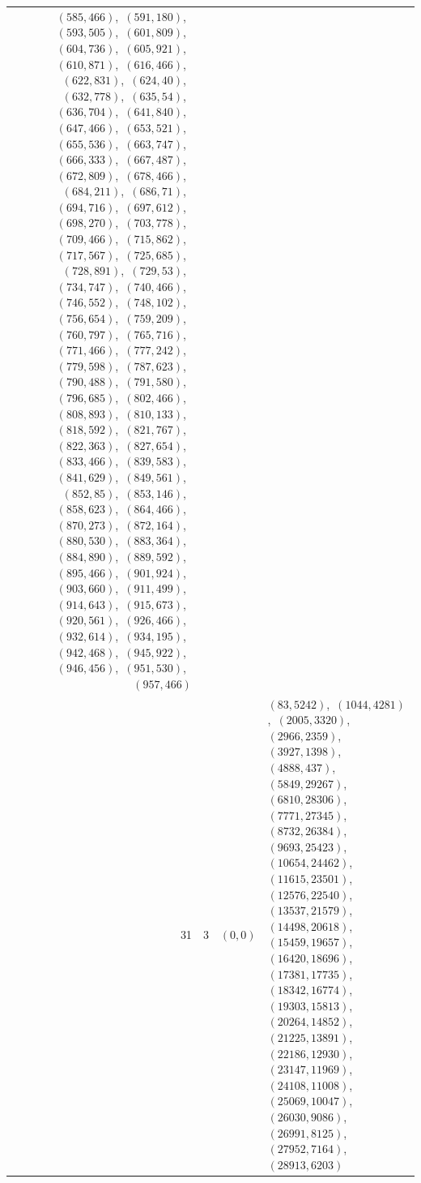 \documentclass[11pt]{article}
\begin{document}
\begin{longtable}{@{}rrl>{\raggedright\arraybackslash}p{}@{}}
$(585,466)$,\allowbreak\ $(591,180)$,\allowbreak\ $(593,505)$,\allowbreak\ $(601,809)$,\allowbreak\ $(604,736)$,\allowbreak\ $(605,921)$,\allowbreak\ $(610,871)$,\allowbreak\ $(616,466)$,\allowbreak\ $(622,831)$,\allowbreak\ $(624,40)$,\allowbreak\ $(632,778)$,\allowbreak\ $(635,54)$,\allowbreak\ $(636,704)$,\allowbreak\ $(641,840)$,\allowbreak\ $(647,466)$,\allowbreak\ $(653,521)$,\allowbreak\ $(655,536)$,\allowbreak\ $(663,747)$,\allowbreak\ $(666,333)$,\allowbreak\ $(667,487)$,\allowbreak\ $(672,809)$,\allowbreak\ $(678,466)$,\allowbreak\ $(684,211)$,\allowbreak\ $(686,71)$,\allowbreak\ $(694,716)$,\allowbreak\ $(697,612)$,\allowbreak\ $(698,270)$,\allowbreak\ $(703,778)$,\allowbreak\ $(709,466)$,\allowbreak\ $(715,862)$,\allowbreak\ $(717,567)$,\allowbreak\ $(725,685)$,\allowbreak\ $(728,891)$,\allowbreak\ $(729,53)$,\allowbreak\ $(734,747)$,\allowbreak\ $(740,466)$,\allowbreak\ $(746,552)$,\allowbreak\ $(748,102)$,\allowbreak\ $(756,654)$,\allowbreak\ $(759,209)$,\allowbreak\ $(760,797)$,\allowbreak\ $(765,716)$,\allowbreak\ $(771,466)$,\allowbreak\ $(777,242)$,\allowbreak\ $(779,598)$,\allowbreak\ $(787,623)$,\allowbreak\ $(790,488)$,\allowbreak\ $(791,580)$,\allowbreak\ $(796,685)$,\allowbreak\ $(802,466)$,\allowbreak\ $(808,893)$,\allowbreak\ $(810,133)$,\allowbreak\ $(818,592)$,\allowbreak\ $(821,767)$,\allowbreak\ $(822,363)$,\allowbreak\ $(827,654)$,\allowbreak\ $(833,466)$,\allowbreak\ $(839,583)$,\allowbreak\ $(841,629)$,\allowbreak\ $(849,561)$,\allowbreak\ $(852,85)$,\allowbreak\ $(853,146)$,\allowbreak\ $(858,623)$,\allowbreak\ $(864,466)$,\allowbreak\ $(870,273)$,\allowbreak\ $(872,164)$,\allowbreak\ $(880,530)$,\allowbreak\ $(883,364)$,\allowbreak\ $(884,890)$,\allowbreak\ $(889,592)$,\allowbreak\ $(895,466)$,\allowbreak\ $(901,924)$,\allowbreak\ $(903,660)$,\allowbreak\ $(911,499)$,\allowbreak\ $(914,643)$,\allowbreak\ $(915,673)$,\allowbreak\ $(920,561)$,\allowbreak\ $(926,466)$,\allowbreak\ $(932,614)$,\allowbreak\ $(934,195)$,\allowbreak\ $(942,468)$,\allowbreak\ $(945,922)$,\allowbreak\ $(946,456)$,\allowbreak\ $(951,530)$,\allowbreak\ $(957,466)$\\
31 & 3 & $(0,0)$ & $(83,5242)$,\allowbreak\ $(1044,4281)$,\allowbreak\ $(2005,3320)$,\allowbreak\ $(2966,2359)$,\allowbreak\ $(3927,1398)$,\allowbreak\ $(4888,437)$,\allowbreak\ $(5849,29267)$,\allowbreak\ $(6810,28306)$,\allowbreak\ $(7771,27345)$,\allowbreak\ $(8732,26384)$,\allowbreak\ $(9693,25423)$,\allowbreak\ $(10654,24462)$,\allowbreak\ $(11615,23501)$,\allowbreak\ $(12576,22540)$,\allowbreak\ $(13537,21579)$,\allowbreak\ $(14498,20618)$,\allowbreak\ $(15459,19657)$,\allowbreak\ $(16420,18696)$,\allowbreak\ $(17381,17735)$,\allowbreak\ $(18342,16774)$,\allowbreak\ $(19303,15813)$,\allowbreak\ $(20264,14852)$,\allowbreak\ $(21225,13891)$,\allowbreak\ $(22186,12930)$,\allowbreak\ $(23147,11969)$,\allowbreak\ $(24108,11008)$,\allowbreak\ $(25069,10047)$,\allowbreak\ $(26030,9086)$,\allowbreak\ $(26991,8125)$,\allowbreak\ $(27952,7164)$,\allowbreak\ $(28913,6203)$\\

\end{longtable}
\end{document}
